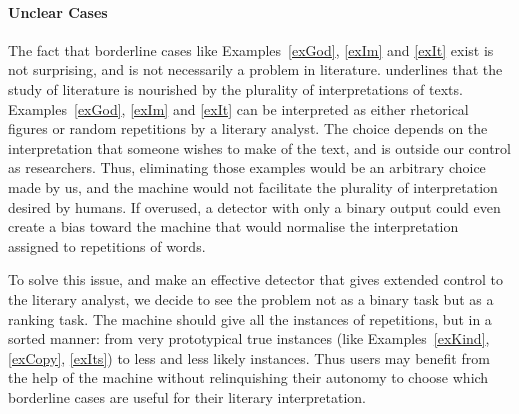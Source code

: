 \paragraph{Unclear Cases}
%
%
\vspace{-0.8cm}
%
%
\vspace{-0.8cm}
%
%

\noindent
The fact that borderline cases like Examples~\ref{exGod}, \ref{exIm} and \ref{exIt} exist is not surprising, and is not necessarily a problem in literature. \cite{hammond2013} underlines that the study of literature is nourished by the plurality of interpretations of texts. Examples~\ref{exGod}, \ref{exIm} and \ref{exIt} can be interpreted as either rhetorical figures or random repetitions by a literary analyst. The choice depends on the interpretation that someone wishes to make of the text, and is outside our control as researchers. 
Thus, eliminating those examples would be an arbitrary choice made by us, and the machine would not facilitate the plurality of interpretation desired by humans. If overused, a detector with only a binary output could even create a bias toward the machine that would normalise the interpretation assigned to repetitions of words.

To solve this issue, and make an effective detector that gives extended control to the literary analyst, we decide to see the problem not as a binary task but as a ranking task. The machine should give all the instances of repetitions,  but in a sorted manner: from very prototypical true instances (like Examples~\ref{exKind}, \ref{exCopy}, \ref{exIts}) to less and less likely instances. Thus users may benefit from the help of the machine without relinquishing their autonomy to choose which borderline cases are useful for their literary interpretation.
